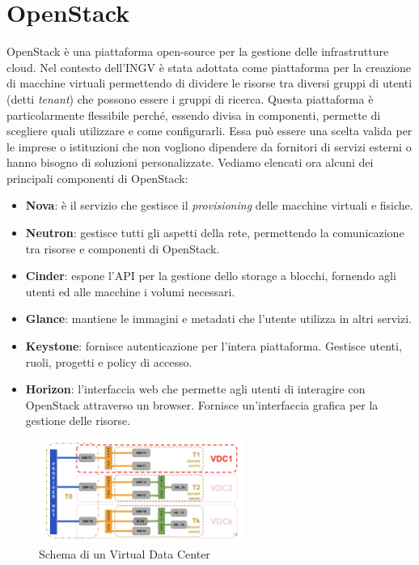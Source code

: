 \documentclass[12pt,a4paper,openright,twoside]{book}
\begin{document}
\section{OpenStack}
OpenStack è una piattaforma open-source per la gestione delle infrastrutture cloud. Nel contesto dell'INGV è stata adottata come piattaforma per la creazione di
macchine virtuali permettendo di dividere le risorse tra diversi gruppi di utenti (detti \textit{tenant}) che possono essere i gruppi di ricerca.
Questa piattaforma è particolarmente flessibile perché, essendo divisa in componenti, permette di scegliere quali utilizzare e come configurarli. Essa può essere
una scelta valida per le imprese o istituzioni che non vogliono dipendere da fornitori di servizi esterni o hanno bisogno di soluzioni personalizzate.
Vediamo elencati ora alcuni dei principali componenti di OpenStack\cite{amslaurea29330}:
%
%
\begin{itemize}
    \item \textbf{Nova}: è il servizio che gestisce il \textit{provisioning} delle macchine virtuali e fisiche. 
    \item \textbf{Neutron}: gestisce tutti gli aspetti della rete, permettendo la comunicazione tra risorse e componenti di OpenStack. 
    \item \textbf{Cinder}: espone l'API per la gestione dello storage a blocchi, fornendo agli utenti ed alle macchine i volumi necessari.
    \item \textbf{Glance}: mantiene le immagini e metadati che l'utente utilizza in altri servizi. 
    \item \textbf{Keystone}: fornisce autenticazione per l'intera piattaforma. Gestisce utenti, ruoli, progetti e policy di accesso.
    \item \textbf{Horizon}: l'interfaccia web che permette agli utenti di interagire con OpenStack attraverso un browser. Fornisce un'interfaccia grafica per la gestione delle risorse.
\end{itemize}
\begin{figure}
    \centering
    \includegraphics[width=0.6\textwidth]{figures/vdc-diagram.png}
    \caption{Schema di un Virtual Data Center}
    \label{fig:vdc}
\end{figure}
\end{document}
